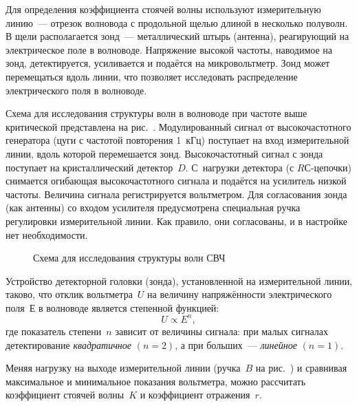 
Для определения коэффициента стоячей волны используют измерительную
линию~--- отрезок волновода с продольной щелью длиной в несколько полуволн. В
щели располагается зонд~--- металлический штырь (антенна), реагирующий
на электрическое поле в волноводе. Напряжение высокой частоты, наводимое на
зонд, детектируется, усиливается и подаётся на микровольтметр. Зонд может
перемещаться вдоль линии, что позволяет исследовать распределение электрического
поля в волноводе.

Схема для исследования структуры волн в волноводе при частоте выше
критической представлена на рис.~. Модулированный
сигнал от высокочастотного генератора (цуги с частотой повторения 1~кГц)
поступает на вход измерительной линии, вдоль которой перемешается зонд.
Высокочастотный сигнал с зонда поступает на кристаллический детектор~$D$.
С~нагрузки детектора (с $RС$-цепочки) снимается огибающая высокочастотного
сигнала и подаётся на усилитель низкой частоты. Величина сигнала регистрируется
вольтметром. Для согласования зонда (как антенны) со входом усилителя 
предусмотрена специальная ручка регулировки измерительной линии. 
Как правило, они согласованы, и в настройке нет необходимости. 

\begin{figure}[h!]
    \caption{Схема для исследования структуры волн СВЧ} 
\end{figure}




Устройство детекторной головки (зонда), установленной на измерительной линии, 
таково, что отклик вольтметра~$U$ на величину напряжённости электрического 
поля~$Е$ в волноводе является степенной функцией:
\begin{equation*} 
U\propto E^{n}, 
\end{equation*}
где показатель степени~$n$ зависит от величины сигнала: 
при малых сигналах детектирование \emph{квадратичное} $(n=2)$, 
а при больших~--- \emph{линейное} $(n=1)$.

Меняя нагрузку на выходе измерительной линии (ручка~$B$ 
на рис.~) и сравнивая максимальное 
и минимальное показания вольтметра, можно рассчитать коэффициент 
стоячей волны~$K$ и коэффициент отражения~$r$.


